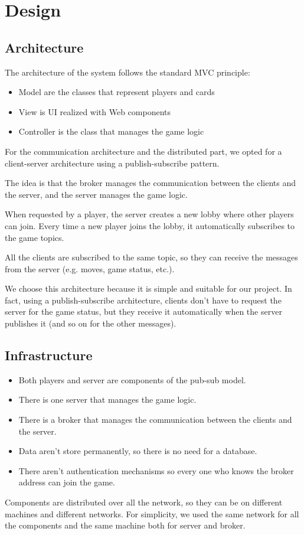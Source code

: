 \documentclass{scrartcl}
\begin{document}
\newpage
\section{Design}\label{design}
\subsection{Architecture}\label{architecture}
The architecture of the system follows the standard MVC principle:
\begin{itemize}
      \item Model are the classes that represent players and cards
      \item View is UI realized with Web components
      \item Controller is the class that manages the game logic
\end{itemize}
For the communication architecture and the distributed part, we opted for a client-server architecture
using a publish-subscribe pattern.

The idea is that the broker manages the communication between the clients and the server, and the
server manages the game logic.

When requested by a player, the server creates a new lobby where other players can join. Every time
a new player joins the lobby, it automatically subscribes to the game topics.

All the clients are subscribed to the same topic, so they can receive the messages from the server
(e.g. moves, game status, etc.).

We choose this architecture because it is simple and suitable for our project.
In fact, using a publish-subscribe architecture, clients don't have to request the server for the game
status, but they receive it automatically when the server publishes it
(and so on for the other messages).

\subsection{Infrastructure}\label{infrastructure}
\begin{itemize}
      \item Both players and server are components of the pub-sub model.
      \item There is one server that manages the game logic.
      \item There is a broker that manages the communication between the clients and the server.
      \item Data aren't store permanently, so there is no need for a database.
      \item There aren't authentication mechanisms so every one who knows the broker address can join
            the game.
\end{itemize}
Components are distributed over all the network, so they can be on different machines and different
networks. For simplicity, we used the same network for all the components and the same machine both
for server and broker.
\end{document}

